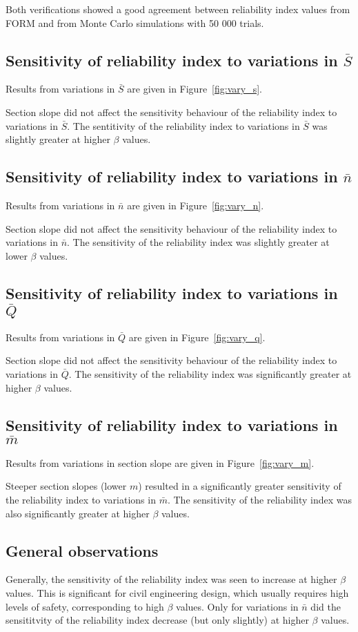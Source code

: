 \documentclass[a4paper]{article}
\begin{document}
Both verifications showed a good agreement between
reliability index values from FORM and from Monte Carlo simulations with 50 000 trials.

\subsection{Sensitivity of reliability index to variations in $\bar{S}$}
Results from variations in $\bar{S}$ are given in Figure~\ref{fig:vary_s}.

Section slope did not affect the sensitivity behaviour of the reliability
index to variations in $\bar{S}$.
The sentitivity of the reliability index to variations
in $\bar{S}$ was slightly greater at higher $\beta$ values.

\subsection{Sensitivity of reliability index to variations in $\bar{n}$}
Results from variations in $\bar{n}$ are given in Figure~\ref{fig:vary_n}.

Section slope did not affect the sensitivity behaviour of the reliability
index to variations in $\bar{n}$.
The sensitivity of the reliability index was slightly greater at lower $\beta$
values.

\subsection{Sensitivity of reliability index to variations in $\bar{Q}$}
Results from variations in $\bar{Q}$ are given in Figure~\ref{fig:vary_q}.

Section slope did not affect the sensitivity behaviour of the reliability
index to variations in $\bar{Q}$.
The sensitivity of the reliability index was significantly greater at higher $\beta$
values.

\subsection{Sensitivity of reliability index to variations in $\bar{m}$}
Results from variations in section slope are given in Figure~\ref{fig:vary_m}.

Steeper section slopes (lower $m$) resulted in a significantly greater sensitivity of
the reliability index to variations in $\bar{m}$. 
The sensitivity of the reliability index was also significantly 
greater at higher $\beta$ values.

\subsection{General observations}
Generally, the sensitivity of the reliability index was seen to increase
at higher $\beta$ values.
This is significant for civil engineering design, which usually
requires high levels of safety, corresponding to high $\beta$ values.
Only for variations in $\bar{n}$ did the sensititvity of the reliability
index decrease (but only slightly) at higher $\beta$ values.
\end{document}

